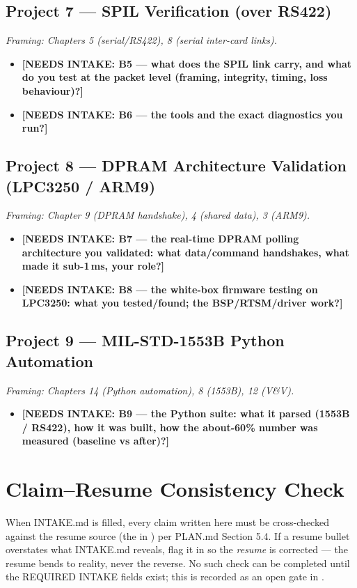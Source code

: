 \subsection{Project 7 --- SPIL Verification (over RS422)}
\emph{Framing: Chapters 5 (serial/RS422), 8 (serial inter-card links).}
\begin{itemize}
\item \textbf{[NEEDS INTAKE: B5 --- what does the SPIL link carry, and what do
  you test at the packet level (framing, integrity, timing, loss behaviour)?]}
\item \textbf{[NEEDS INTAKE: B6 --- the tools and the exact diagnostics you run?]}
\end{itemize}

\subsection{Project 8 --- DPRAM Architecture Validation (LPC3250 / ARM9)}
\emph{Framing: Chapter 9 (DPRAM handshake), 4 (shared data), 3 (ARM9).}
\begin{itemize}
\item \textbf{[NEEDS INTAKE: B7 --- the real-time DPRAM polling architecture you
  validated: what data/command handshakes, what made it sub-1\,ms, your role?]}
\item \textbf{[NEEDS INTAKE: B8 --- the white-box firmware testing on LPC3250:
  what you tested/found; the BSP/RTSM/driver work?]}
\end{itemize}

\subsection{Project 9 --- MIL-STD-1553B Python Automation}
\emph{Framing: Chapters 14 (Python automation), 8 (1553B), 12 (V\&V).}
\begin{itemize}
\item \textbf{[NEEDS INTAKE: B9 --- the Python suite: what it parsed (1553B /
  RS422), how it was built, how the about-60\% number was measured (baseline vs
  after)?]}
\end{itemize}

\section{Claim--Resume Consistency Check}
\begin{partnote}
When INTAKE.md is filled, every claim written here must be cross-checked against
the resume source (the  in ) per PLAN.md Section 5.4. If
a resume bullet overstates what INTAKE.md reveals, flag it in 
so the \emph{resume} is corrected --- the resume bends to reality, never the
reverse. No such check can be completed until the REQUIRED INTAKE fields exist;
this is recorded as an open gate in .
\end{partnote}
